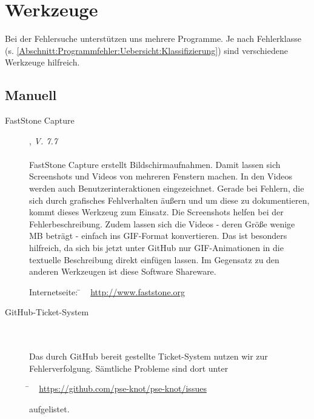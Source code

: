 %



\section{Werkzeuge}
\label{Abschnitt:Programmfehler:Werkzeuge}

Bei der Fehlersuche unterstützen uns mehrere Programme.
Je nach Fehlerklasse (s. \ref{Abschnitt:Programmfehler:Uebersicht:Klassifizierung}) sind verschiedene Werkzeuge hilfreich.




\subsection{Manuell}
\label{Abschnitt:Programmfehler:Werkzeuge:Manuell}


\begin{description}

	\item[FastStone Capture], \textit{V. 7.7}\hfill
		\\
		\\
		FastStone Capture erstellt Bildschirmaufnahmen. Damit lassen sich Screenshots und Videos von mehreren Fenstern machen. In den Videos werden auch Benutzerinteraktionen eingezeichnet. Gerade bei Fehlern, die sich durch grafisches Fehlverhalten äußern und um diese zu dokumentieren, kommt dieses Werkzeug zum Einsatz. Die Screenshots helfen bei der Fehlerbeschreibung. Zudem lassen sich die Videos - deren Größe wenige MB beträgt - einfach ins GIF-Format konvertieren. Das ist besonders hilfreich, da sich bis jetzt unter GitHub nur GIF-Animationen in die textuelle Beschreibung direkt einfügen lassen. Im Gegensatz zu den anderen Werkzeugen ist diese Software Shareware.
		
		\begin{tabbing}
			Internetseite:
			\= ~ \href {http://www.faststone.org}
		    	       {http://www.faststone.org}
		    \\
		\end{tabbing}
		
		\item[GitHub-Ticket-System] \hfill
		\\
		\\
		Das durch GitHub bereit gestellte Ticket-System nutzen wir zur Fehlerverfolgung. Sämtliche Probleme sind dort unter
		
		\begin{tabbing}
				\= ~ \href {https://github.com/pse-knot/pse-knot/issues}
    	       			   {https://github.com/pse-knot/pse-knot/issues}
    	       			   
		\end{tabbing} aufgelistet.
		

\end{description}



